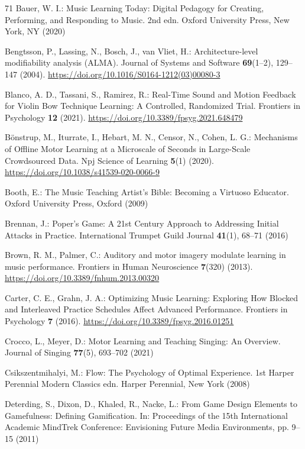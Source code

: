 \documentclass[runningheads]{llncs}
\begin{document}
\begin{thebibliography}{71}
Bauer, W. I.: Music Learning Today: Digital Pedagogy for Creating, Performing, and Responding to Music. 2nd edn. Oxford University Press, New York, NY (2020)

Bengtsson, P., Lassing, N., Bosch, J., van Vliet, H.: Architecture-level modifiability analysis (ALMA). Journal of Systems and Software \textbf{69}(1--2), 129--147 (2004). \url{https://doi.org/10.1016/S0164-1212(03)00080-3}

Blanco, A. D., Tassani, S., Ramirez, R.: Real-Time Sound and Motion Feedback for Violin Bow Technique Learning: A Controlled, Randomized Trial. Frontiers in Psychology \textbf{12} (2021). \url{https://doi.org/10.3389/fpsyg.2021.648479}

Bönstrup, M., Iturrate, I., Hebart, M. N., Censor, N., Cohen, L. G.: Mechanisms of Offline Motor Learning at a Microscale of Seconds in Large-Scale Crowdsourced Data. Npj Science of Learning \textbf{5}(1) (2020). \url{https://doi.org/10.1038/s41539-020-0066-9}

Booth, E.: The Music Teaching Artist's Bible: Becoming a Virtuoso Educator. Oxford University Press, Oxford (2009)

Brennan, J.: Poper's Game: A 21st Century Approach to Addressing Initial Attacks in Practice. International Trumpet Guild Journal \textbf{41}(1), 68--71 (2016)

Brown, R. M., Palmer, C.: Auditory and motor imagery modulate learning in music performance. Frontiers in Human Neuroscience \textbf{7}(320) (2013). \url{https://doi.org/10.3389/fnhum.2013.00320}

Carter, C. E., Grahn, J. A.: Optimizing Music Learning: Exploring How Blocked and Interleaved Practice Schedules Affect Advanced Performance. Frontiers in Psychology \textbf{7} (2016). \url{https://doi.org/10.3389/fpsyg.2016.01251}

Crocco, L., Meyer, D.: Motor Learning and Teaching Singing: An Overview. Journal of Singing \textbf{77}(5), 693--702 (2021)

Csikszentmihalyi, M.: Flow: The Psychology of Optimal Experience. 1st Harper Perennial Modern Classics edn. Harper Perennial, New York (2008)

Deterding, S., Dixon, D., Khaled, R., Nacke, L.: From Game Design Elements to Gamefulness: Defining Gamification. In: Proceedings of the 15th International Academic MindTrek Conference: Envisioning Future Media Environments, pp. 9--15 (2011)


\end{thebibliography}
\end{document}
